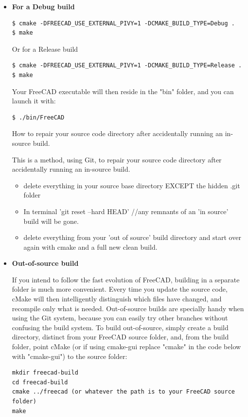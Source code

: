 \begin{itemize}
\begin{itemize}
\item
\textbf{For a Debug build}

\begin{verbatim}
$ cmake -DFREECAD_USE_EXTERNAL_PIVY=1 -DCMAKE_BUILD_TYPE=Debug .
$ make
\end{verbatim}
Or for a Release build

\begin{verbatim}
$ cmake -DFREECAD_USE_EXTERNAL_PIVY=1 -DCMAKE_BUILD_TYPE=Release .
$ make
\end{verbatim}

Your FreeCAD executable will then reside in the "bin" folder, and you can launch it with:

\begin{verbatim}
$ ./bin/FreeCAD
\end{verbatim}




How to repair your source code directory after accidentally running an in-source build.

This is a method, using Git, to repair your source code directory after accidentally running an in-source build.

\begin{itemize}
\item delete everything in your source base directory EXCEPT the hidden .git folder
\item In terminal 'git reset --hard HEAD'
//any remnants of an 'in source' build will be gone.
\item delete everything from your 'out of source' build directory and start over again with cmake and a full new clean build.
\end{itemize}

\item 
\textbf{Out-of-source build}

If you intend to follow the fast evolution of FreeCAD, building in a separate folder is much more convenient. Every time you update the source code, cMake will then intelligently distinguish which files have changed, and recompile only what is needed. Out-of-source builds are specially handy when using the Git system, because you can easily try other branches without confusing the build system. To build out-of-source, simply create a build directory, distinct from your FreeCAD source folder, and, from the build folder, point cMake (or if using cmake-gui replace "cmake" in the code below with "cmake-gui") to the source folder:

\begin{verbatim}
mkdir freecad-build
cd freecad-build
cmake ../freecad (or whatever the path is to your FreeCAD source folder)
make
\end{verbatim}


\end{itemize}
\end{itemize}
